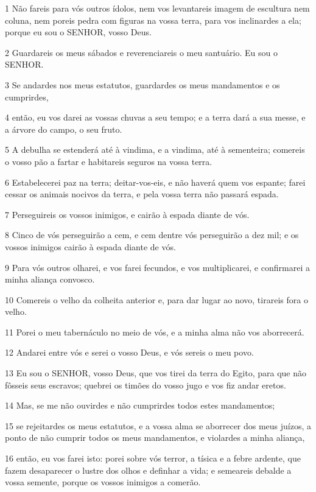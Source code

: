 \par 1 Não fareis para vós outros ídolos, nem vos levantareis imagem de escultura nem coluna, nem poreis pedra com figuras na vossa terra, para vos inclinardes a ela; porque eu sou o SENHOR, vosso Deus.
\par 2 Guardareis os meus sábados e reverenciareis o meu santuário. Eu sou o SENHOR.
\par 3 Se andardes nos meus estatutos, guardardes os meus mandamentos e os cumprirdes,
\par 4 então, eu vos darei as vossas chuvas a seu tempo; e a terra dará a sua messe, e a árvore do campo, o seu fruto.
\par 5 A debulha se estenderá até à vindima, e a vindima, até à sementeira; comereis o vosso pão a fartar e habitareis seguros na vossa terra.
\par 6 Estabelecerei paz na terra; deitar-vos-eis, e não haverá quem vos espante; farei cessar os animais nocivos da terra, e pela vossa terra não passará espada.
\par 7 Perseguireis os vossos inimigos, e cairão à espada diante de vós.
\par 8 Cinco de vós perseguirão a cem, e cem dentre vós perseguirão a dez mil; e os vossos inimigos cairão à espada diante de vós.
\par 9 Para vós outros olharei, e vos farei fecundos, e vos multiplicarei, e confirmarei a minha aliança convosco.
\par 10 Comereis o velho da colheita anterior e, para dar lugar ao novo, tirareis fora o velho.
\par 11 Porei o meu tabernáculo no meio de vós, e a minha alma não vos aborrecerá.
\par 12 Andarei entre vós e serei o vosso Deus, e vós sereis o meu povo.
\par 13 Eu sou o SENHOR, vosso Deus, que vos tirei da terra do Egito, para que não fôsseis seus escravos; quebrei os timões do vosso jugo e vos fiz andar eretos.
\par 14 Mas, se me não ouvirdes e não cumprirdes todos estes mandamentos;
\par 15 se rejeitardes os meus estatutos, e a vossa alma se aborrecer dos meus juízos, a ponto de não cumprir todos os meus mandamentos, e violardes a minha aliança,
\par 16 então, eu vos farei isto: porei sobre vós terror, a tísica e a febre ardente, que fazem desaparecer o lustre dos olhos e definhar a vida; e semeareis debalde a vossa semente, porque os vossos inimigos a comerão.
